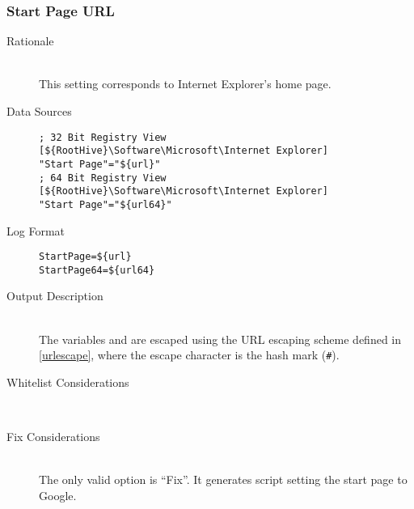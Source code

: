 \subsubsection{Start Page URL}
\begin{description}
\item[Rationale]  \hfill \\ This setting corresponds to Internet Explorer's home
page.

\item[Data Sources] \hfill
\vspace{-\baselineskip}
\begin{verbatim}
; 32 Bit Registry View
[${RootHive}\Software\Microsoft\Internet Explorer]
"Start Page"="${url}"
; 64 Bit Registry View
[${RootHive}\Software\Microsoft\Internet Explorer]
"Start Page"="${url64}"
\end{verbatim}
\item[Log Format] \hfill
\vspace{-\baselineskip}
\begin{verbatim} 
StartPage=${url}
StartPage64=${url64}
\end{verbatim}
\item[Output Description] \hfill \\
The variables  and  are escaped using the URL escaping
scheme defined in \ref{urlescape}, where the escape character is the hash mark
(\verb|#|).
\item[Whitelist Considerations] \hfill \\

\item[Fix Considerations] \hfill \\
The only valid option is ``Fix''. It generates script setting the start page to
Google.
\end{description}

